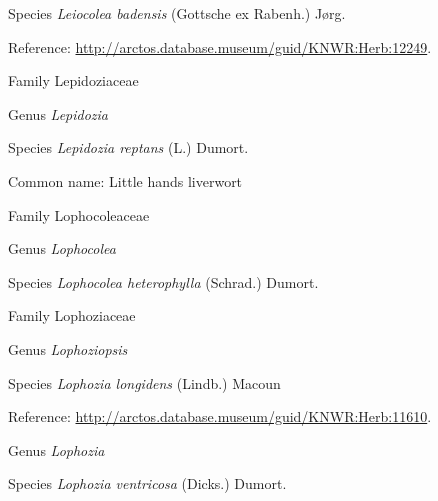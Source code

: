 \documentclass[9pt, article]{memoir}
\begin{document}
\begin{multicols}{2}
\vspace{6pt}\noindent\hspace{36pt}Species \textit{Leiocolea badensis} (Gottsche ex Rabenh.) Jørg.


Reference: 
\url{http://arctos.database.museum/guid/KNWR:Herb:12249}.

\vspace{6pt}\noindent\hspace{24pt}Family Lepidoziaceae


\vspace{6pt}\noindent\hspace{30pt}Genus \textit{Lepidozia}


\vspace{6pt}\noindent\hspace{36pt}Species \textit{Lepidozia reptans} (L.) Dumort.


Common name: Little hands liverwort

\vspace{6pt}\noindent\hspace{24pt}Family Lophocoleaceae


\vspace{6pt}\noindent\hspace{30pt}Genus \textit{Lophocolea}


\vspace{6pt}\noindent\hspace{36pt}Species \textit{Lophocolea heterophylla} (Schrad.) Dumort.


\vspace{6pt}\noindent\hspace{24pt}Family Lophoziaceae


\vspace{6pt}\noindent\hspace{30pt}Genus \textit{Lophoziopsis}


\vspace{6pt}\noindent\hspace{36pt}Species \textit{Lophozia longidens} (Lindb.) Macoun


Reference: 
\url{http://arctos.database.museum/guid/KNWR:Herb:11610}.

\vspace{6pt}\noindent\hspace{30pt}Genus \textit{Lophozia}


\vspace{6pt}\noindent\hspace{36pt}Species \textit{Lophozia ventricosa} (Dicks.) Dumort.



\end{multicols}
\end{document}

